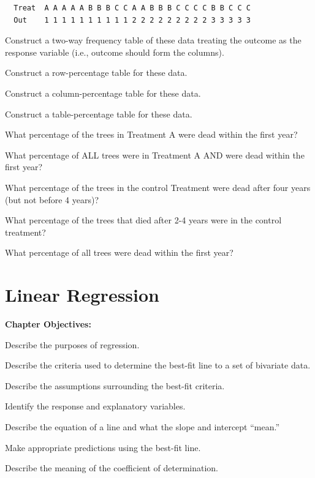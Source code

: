 \documentclass[10pt,openany]{book}\usepackage[]{graphicx}\usepackage[]{color}
\begin{document}
\begin{hwsection}
  \begin{Verbatim}
  Treat  A A A A A B B B C C A A B B B C C C C B B C C C
  Out    1 1 1 1 1 1 1 1 1 1 2 2 2 2 2 2 2 2 2 3 3 3 3 3
  \end{Verbatim}

  \begin{Enumerate}
    \item Construct a two-way frequency table of these data treating the outcome as the response variable (i.e., outcome should form the columns).
    \item Construct a row-percentage table for these data.
    \item Construct a column-percentage table for these data.
    \item Construct a table-percentage table for these data.
    \item What percentage of the trees in Treatment A were dead within the first year?
    \item What percentage of ALL trees were in Treatment A AND were dead within the first year?
    \item What percentage of the trees in the control Treatment were dead after four years (but not before 4 years)?
    \item What percentage of the trees that died after 2-4 years were in the control treatment?
    \item What percentage of all trees were dead within the first year?
  \end{Enumerate}

\end{hwsection}



\chapter{Linear Regression}  \label{chap:Regress}
\begin{ChapObj}{\boxwidth}
  \textbf{Chapter Objectives:}
  \begin{Enumerate}
    \item Describe the purposes of regression.
    \item Describe the criteria used to determine the best-fit line to a set of bivariate data.
    \item Describe the assumptions surrounding the best-fit criteria.
    \item Identify the response and explanatory variables.
    \item Describe the equation of a line and what the slope and intercept ``mean.''
    \item Make appropriate predictions using the best-fit line.
    \item Describe the meaning of the coefficient of determination.
  \end{Enumerate}
\end{ChapObj}
\end{document}
